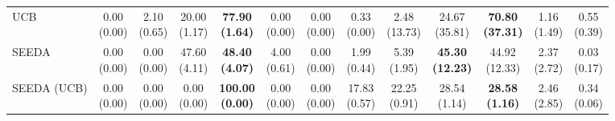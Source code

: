 \begin{table}[H]
{\begin{tabular}{l|cccccc|cccccc}
UCB & \makecell{0.00 \\ (0.00)} & \makecell{2.10 \\ (0.65)} & {\cellcolor[HTML]{C8E6C9}} \makecell{20.00 \\ (1.17)} & \bfseries \makecell{77.90 \\ (1.64)} & \makecell{0.00 \\ (0.00)} & \makecell{0.00 \\ (0.00)} & \makecell{0.33 \\ (0.00)} & \makecell{2.48 \\ (13.73)} & {\cellcolor[HTML]{C8E6C9}} \makecell{24.67 \\ (35.81)} & \bfseries \makecell{70.80 \\ (37.31)} & \makecell{1.16 \\ (1.49)} & \makecell{0.55 \\ (0.39)} \\
SEEDA & \makecell{0.00 \\ (0.00)} & \makecell{0.00 \\ (0.00)} & {\cellcolor[HTML]{C8E6C9}} \makecell{47.60 \\ (4.11)} & \bfseries \makecell{48.40 \\ (4.07)} & \makecell{4.00 \\ (0.61)} & \makecell{0.00 \\ (0.00)} & \makecell{1.99 \\ (0.44)} & \makecell{5.39 \\ (1.95)} & {\cellcolor[HTML]{C8E6C9}} \bfseries \makecell{45.30 \\ (12.23)} & \makecell{44.92 \\ (12.33)} & \makecell{2.37 \\ (2.72)} & \makecell{0.03 \\ (0.17)} \\
SEEDA (UCB) & \makecell{0.00 \\ (0.00)} & \makecell{0.00 \\ (0.00)} & {\cellcolor[HTML]{C8E6C9}} \makecell{0.00 \\ (0.00)} & \bfseries \makecell{100.00 \\ (0.00)} & \makecell{0.00 \\ (0.00)} & \makecell{0.00 \\ (0.00)} & \makecell{17.83 \\ (0.57)} & \makecell{22.25 \\ (0.91)} & {\cellcolor[HTML]{C8E6C9}} \makecell{28.54 \\ (1.14)} & \bfseries \makecell{28.58 \\ (1.16)} & \makecell{2.46 \\ (2.85)} & \makecell{0.34 \\ (0.06)} \\

\end{tabular}}
\end{table}

